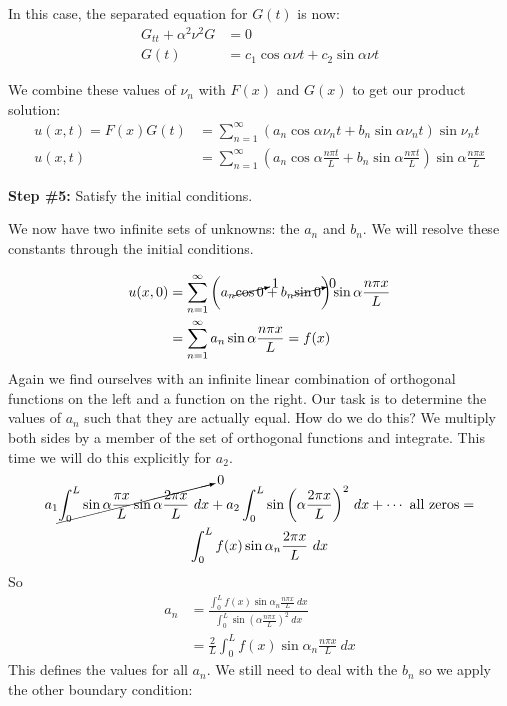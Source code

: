 \vspace{0.25cm}

\noindent In this case, the separated equation for $G(t)$ is now:
\begin{align*}
G_{tt} + \alpha^2 \nu^2 G &= 0 \\
G(t) &= c_1 \cos{\alpha \nu t} + c_2 \sin{\alpha \nu t}
\end{align*}



\noindent We combine these values of $\nu_n$ with $F(x)$ and $G(x)$ to get our product solution:
\begin{align*}
u(x,t) = F(x)G(t) &= \sum\limits_{n=1}^{\infty} \left(a_n \cos{\alpha \nu_n t} + b_n \sin{\alpha \nu_n t}\right)\sin{\nu_n t} \\
u(x,t) &= \sum\limits_{n=1}^{\infty} \left(a_n \cos{\alpha \frac{n \pi t}{L}} + b_n \sin{\alpha \frac{n \pi t}{L}} \right) \sin{\alpha \frac{n \pi x}{L}}
\end{align*}

\vspace{0.5cm}

\noindent\textbf{Step \#5:} Satisfy the initial conditions.

\vspace{0.25cm}

\noindent We now have two infinite sets of unknowns: the $a_n$ and $b_n$.  We will resolve these constants through the initial conditions.

\begin{align*}
u(x,0) &= \sum\limits_{n=1}^{\infty} \left(a_n \cancelto{1}{\cos{0}} + b_n \cancelto{0}{\sin{0}} \right)\sin{\alpha \frac{n \pi x}{L}} \\
&= \sum\limits_{n=1}^{\infty} a_n \sin{\alpha \frac{n \pi x}{L}} = f(x)
\end{align*}
Again we find ourselves with an infinite linear combination of orthogonal functions on the left and a function on the right.  Our task is to determine the values of $a_n$ such that they are actually equal.  How do we do this?  We multiply both sides by a member of the set of orthogonal functions and integrate.  This time we will do this explicitly for $a_2$.
\begin{multline*}
a_1 \cancelto{0}{\int_{0}^{L} \sin{\alpha \frac{\pi x}{L}} \sin{\alpha \frac{2 \pi x}{L}} \ dx} + a_2 \int_{0}^{L} \sin{\left(\alpha \frac{2 \pi x}{L}\right)}^2 \ dx + \cdots \text{ all zeros} = \\ \int_{0}^{L} f(x) \sin{\alpha_n \frac{2 \pi x}{L}} \ dx
\end{multline*}
So
\begin{align*}
a_n &= \frac{\int_{0}^{L} f(x) \sin{\alpha_n \frac{n \pi x}{L}} \ dx}{\int_0^L \sin{\left(\alpha \frac{n \pi x}{L} \right)}^2 \ dx} \\
&= \frac{2}{L} \int_{0}^{L} f(x) \sin{\alpha_n \frac{n \pi x}{L}} \ dx
\end{align*}
This defines the values for all $a_n$.  We still need to deal with the $b_n$ so we apply the other boundary condition:

